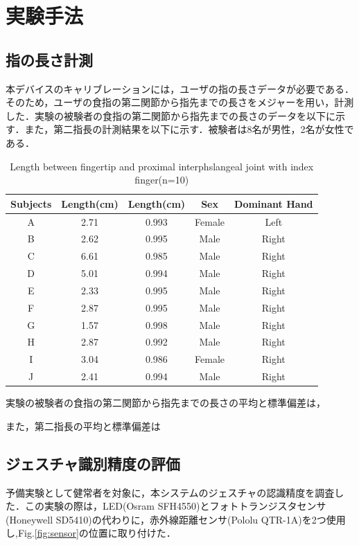 \chapter{実験手法}

\section{指の長さ計測}
本デバイスのキャリブレーションには，ユーザの指の長さデータが必要である．そのため，ユーザの食指の第二関節から指先までの長さをメジャーを用い，計測した．実験の被験者の食指の第二関節から指先までの長さのデータを以下に示す．また，第二指長の計測結果を以下に示す．被験者は8名が男性，2名が女性である．

\begin{table}[H]
  \caption{Length between fingertip and proximal interphslangeal joint with index finger(n=10)}
  \label{table:finger_distance}
  \centering
  \begin{tabular}{ccccc}
    \hline
    Subjects & Length(cm)& Length(cm) & Sex & Dominant Hand\\
    \hline \hline 
    A  & 2.71 & 0.993 & Female & Left\\
    B  & 2.62 & 0.995 & Male & Right\\
    C  & 6.61 & 0.985 & Male & Right\\
    D  & 5.01 & 0.994 & Male & Right\\
    E  & 2.33 & 0.995 & Male & Right\\ 
    F  & 2.87 & 0.995 & Male & Right\\
    G  & 1.57 & 0.998 & Male & Right\\
    H  & 2.87 & 0.992 & Male & Right\\
    I  & 3.04 & 0.986 & Female & Right\\
    J  & 2.41 & 0.994 & Male & Right\\
    \hline
  \end{tabular}
\end{table}

実験の被験者の食指の第二関節から指先までの長さの平均と標準偏差は，

また，第二指長の平均と標準偏差は


\section{ジェスチャ識別精度の評価}
予備実験として健常者を対象に，本システムのジェスチャの認識精度を調査した．この実験の際は，LED(Osram SFH4550)とフォトトランジスタセンサ(Honeywell SD5410)の代わりに，赤外線距離センサ(Pololu QTR-1A)を2つ使用し,Fig.\ref{fig:sensor}の位置に取り付けた．

